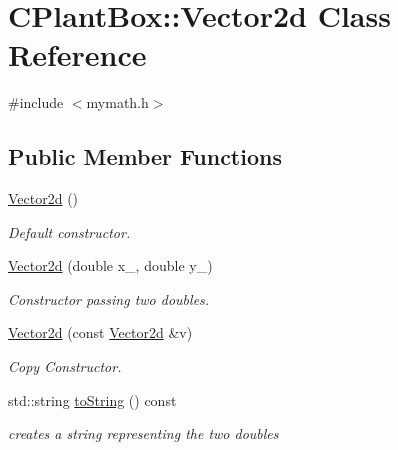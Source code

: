 \hypertarget{classCPlantBox_1_1Vector2d}{}\section{C\+Plant\+Box\+:\+:Vector2d Class Reference}
\label{classCPlantBox_1_1Vector2d}


{\ttfamily \#include $<$mymath.\+h$>$}

\subsection*{Public Member Functions}
\begin{DoxyCompactItemize}
\item 
\mbox{\label{classCPlantBox_1_1Vector2d_a7a5ff08161bf903452bd0055145cc6a2}} 
\hyperlink{classCPlantBox_1_1Vector2d_a7a5ff08161bf903452bd0055145cc6a2}{Vector2d} ()
\begin{DoxyCompactList}\small\item\em Default constructor. \end{DoxyCompactList}\item 
\mbox{\label{classCPlantBox_1_1Vector2d_a5f388f8e9de042bdfd759859856e96e8}} 
\hyperlink{classCPlantBox_1_1Vector2d_a5f388f8e9de042bdfd759859856e96e8}{Vector2d} (double x\+\_\+, double y\+\_\+)
\begin{DoxyCompactList}\small\item\em Constructor passing two doubles. \end{DoxyCompactList}\item 
\mbox{\label{classCPlantBox_1_1Vector2d_a0a0965d0f3a04328224897a195a361c9}} 
\hyperlink{classCPlantBox_1_1Vector2d_a0a0965d0f3a04328224897a195a361c9}{Vector2d} (const \hyperlink{classCPlantBox_1_1Vector2d}{Vector2d} \&v)
\begin{DoxyCompactList}\small\item\em Copy Constructor. \end{DoxyCompactList}\item 
\mbox{\label{classCPlantBox_1_1Vector2d_a066f6a8394dc37f8a3f0f0c37b3c1947}} 
std\+::string \hyperlink{classCPlantBox_1_1Vector2d_a066f6a8394dc37f8a3f0f0c37b3c1947}{to\+String} () const
\begin{DoxyCompactList}\small\item\em creates a string representing the two doubles \end{DoxyCompactList}\end{DoxyCompactItemize}
